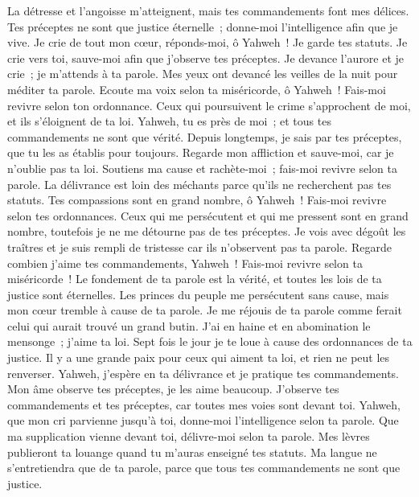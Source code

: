 \begin{multicols}{2}
La détresse et l'angoisse m'atteignent, mais tes commandements font mes délices.
Tes préceptes ne sont que justice éternelle~; donne-moi l'intelligence afin que je vive.
 Je crie de tout mon cœur, réponds-moi, ô Yahweh~! Je garde tes statuts.
Je crie vers toi, sauve-moi afin que j'observe tes préceptes.
Je devance l'aurore et je crie~; je m'attends à ta parole.
Mes yeux ont devancé les veilles de la nuit pour méditer ta parole.
Ecoute ma voix selon ta miséricorde, ô Yahweh~! Fais-moi revivre selon ton ordonnance.
Ceux qui poursuivent le crime s'approchent de moi, et ils s'éloignent de ta loi.
Yahweh, tu es près de moi~; et tous tes commandements ne sont que vérité.
Depuis longtemps, je sais par tes préceptes, que tu les as établis pour toujours.
 Regarde mon affliction et sauve-moi, car je n'oublie pas ta loi.
Soutiens ma cause et rachète-moi~; fais-moi revivre selon ta parole.
La délivrance est loin des méchants parce qu'ils ne recherchent pas tes statuts.
Tes compassions sont en grand nombre, ô Yahweh~! Fais-moi revivre selon tes ordonnances.
Ceux qui me persécutent et qui me pressent sont en grand nombre, toutefois je ne me détourne pas de tes préceptes.
Je vois avec dégoût les traîtres et je suis rempli de tristesse car ils n'observent pas ta parole.
Regarde combien j'aime tes commandements, Yahweh~! Fais-moi revivre selon ta miséricorde~!
Le fondement de ta parole est la vérité, et toutes les lois de ta justice sont éternelles.
 Les princes du peuple me persécutent sans cause, mais mon cœur tremble à cause de ta parole.
Je me réjouis de ta parole comme ferait celui qui aurait trouvé un grand butin.
J'ai en haine et en abomination le mensonge~; j'aime ta loi.
Sept fois le jour je te loue à cause des ordonnances de ta justice.
Il y a une grande paix pour ceux qui aiment ta loi, et rien ne peut les renverser.
Yahweh, j'espère en ta délivrance et je pratique tes commandements.
Mon âme observe tes préceptes, je les aime beaucoup.
J'observe tes commandements et tes préceptes, car toutes mes voies sont devant toi.
 Yahweh, que mon cri parvienne jusqu'à toi, donne-moi l'intelligence selon ta parole.
Que ma supplication vienne devant toi, délivre-moi selon ta parole.
Mes lèvres publieront ta louange quand tu m'auras enseigné tes statuts.
Ma langue ne s'entretiendra que de ta parole, parce que tous tes commandements ne sont que justice.

\end{multicols}
